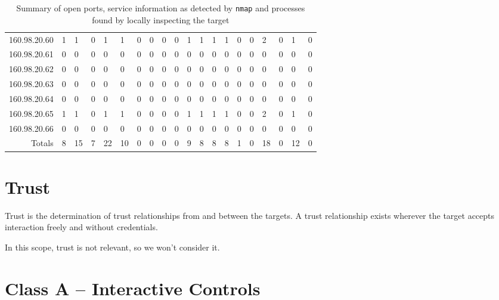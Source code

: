 \documentclass[10pt,a4paper,twoside,onecolumn]{article}
\begin{document}
\begin{table}
\begin{threeparttable}[b]
\begin{tabularx}{\textwidth}{ l | l | X X X | X X X X X | X X X X X | X X X X X }
160.98.20.60 & 1 & 1 & 0 & 1 & 1 & 0 & 0 & 0 & 0 & 1 & 1 & 1 & 1 & 0 & 0 & 2 & 0 & 1 & 0 \\
160.98.20.61 & 0 & 0 & 0 & 0 & 0 & 0 & 0 & 0 & 0 & 0 & 0 & 0 & 0 & 0 & 0 & 0 & 0 & 0 & 0 \\
160.98.20.62 & 0 & 0 & 0 & 0 & 0 & 0 & 0 & 0 & 0 & 0 & 0 & 0 & 0 & 0 & 0 & 0 & 0 & 0 & 0 \\
160.98.20.63 & 0 & 0 & 0 & 0 & 0 & 0 & 0 & 0 & 0 & 0 & 0 & 0 & 0 & 0 & 0 & 0 & 0 & 0 & 0 \\
160.98.20.64 & 0 & 0 & 0 & 0 & 0 & 0 & 0 & 0 & 0 & 0 & 0 & 0 & 0 & 0 & 0 & 0 & 0 & 0 & 0 \\
160.98.20.65 & 1 & 1 & 0 & 1 & 1 & 0 & 0 & 0 & 0 & 1 & 1 & 1 & 1 & 0 & 0 & 2 & 0 & 1 & 0 \\
160.98.20.66 & 0 & 0 & 0 & 0 & 0 & 0 & 0 & 0 & 0 & 0 & 0 & 0 & 0 & 0 & 0 & 0 & 0 & 0 & 0 \\
\hline

\multicolumn{1}{r|}{Totals} & 8 & 15 & 7 & 22 & 10 & 0 & 0 & 0 & 0 & 9 & 8 & 8 & 8 & 1 & 0 & 18 & 0 & 12 & 0\\

\bottomrule
\end{tabularx}

\caption{Summary of open ports, service information as detected by \texttt{nmap} and processes found by locally inspecting the target}
\label{tab:report}
\end{threeparttable}
\end{table}


\section{Trust}

Trust is the determination of trust relationships from and between the targets. A trust relationship exists wherever the target accepts interaction freely and without credentials.

In this scope, trust is not relevant, so we won't consider it.


\section{Class A -- Interactive Controls}
\end{document}
